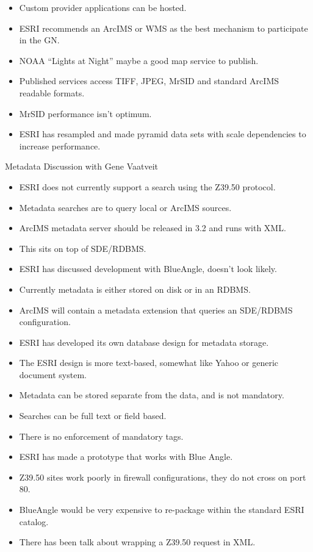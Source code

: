 \begin{itemize}
\item Custom provider applications can be hosted.
\item ESRI recommends an ArcIMS or WMS as the best mechanism to participate in the GN.
\item NOAA ``Lights at Night'' maybe a good map service to publish.
\item Published services access TIFF, JPEG, MrSID and standard ArcIMS readable formats.
\item MrSID performance isn't optimum.
\item ESRI has resampled and made pyramid data sets with scale dependencies to increase 
performance.
\end{itemize}


Metadata Discussion with Gene Vaatveit

\begin{itemize}
\item ESRI does not currently support a search using the Z39.50 protocol.
\item Metadata searches are to query local or ArcIMS sources.
\item ArcIMS metadata server should be released in 3.2 and runs with XML.
\item This sits on top of SDE/RDBMS.
\item ESRI has discussed development with BlueAngle, doesn't look likely.
\item Currently metadata is either stored on disk or in an RDBMS.
\item ArcIMS will contain a metadata extension that queries an SDE/RDBMS configuration.
\item ESRI has developed its own database design for metadata storage.
\item The ESRI design is more text-based, somewhat like Yahoo or generic document system.
\item Metadata can be stored separate from the data, and is not mandatory.
\item Searches can be full text or field based.
\item There is no enforcement of mandatory tags.
\item ESRI has made a prototype that works with Blue Angle.
\item Z39.50 sites work poorly in firewall configurations, they do not cross on port 80.
\item BlueAngle would be very expensive to re-package within the standard ESRI catalog.
\item There has been talk about wrapping a Z39.50 request in XML.

\end{itemize}
